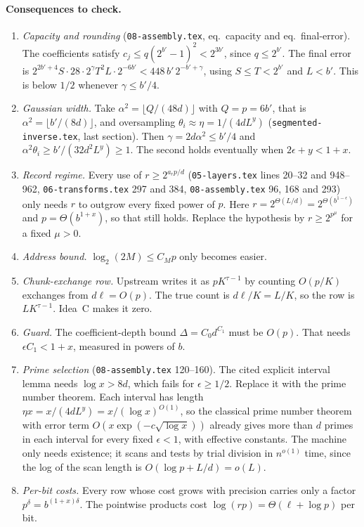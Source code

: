 \documentclass[11pt]{article}
\theoremstyle{remark}\newtheorem*{remark}{Remark}
\begin{document}
\paragraph{Consequences to check.}
\begin{enumerate}
\item \emph{Capacity and rounding} (\texttt{08-assembly.tex}, eq.~capacity and
eq.~final-error). The coefficients satisfy $c_j\le q(2^{b'}-1)^2<2^{3b'}$, since $q\le2^{b'}$.
The final error is $2^{2b'+4}S\cdot28\cdot2^\gamma T^2L\cdot2^{-6b'}<448\,b'\,2^{-b'+\gamma}$,
using $S\le T<2^{b'}$ and $L<b'$. This is below $1/2$ whenever $\gamma\le b'/4$.
\item \emph{Gaussian width.} Take $\alpha^2=\lfloor Q/(48d)\rfloor$ with $Q=p=6b'$, that is $\alpha^2=\lfloor b'/(8d)\rfloor$, and oversampling $\theta_i\approx\eta=1/(4dL^y)$ (\texttt{segmented-inverse.tex}, last section). Then
$\gamma=2d\alpha^2\le b'/4$ and $\alpha^2\theta_i\ge b'/(32d^2L^y)\ge1$. The second holds eventually when $2\epsilon+y<1+x$.
\item \emph{Record regime.} Every use of $r\ge2^{a_rp/d}$ (\texttt{05-layers.tex} lines 20--32
and 948--962, \texttt{06-transforms.tex} 297 and 384, \texttt{08-assembly.tex} 96, 168 and 293)
only needs $r$ to outgrow every fixed power of $p$. Here $r=2^{\Theta(L/d)}=2^{\Theta(b^{1-\epsilon})}$
and $p=\Theta(b^{1+x})$, so that still holds. Replace the hypothesis by
$r\ge2^{p^\mu}$ for a fixed $\mu>0$.
\item \emph{Address bound.} $\log_2(2M)\le C_Mp$ only becomes easier.
\item \emph{Chunk-exchange row.} Upstream writes it as $pK^{\tau-1}$ by counting $O(p/K)$ exchanges from $d\ell=O(p)$. The true count is $d\ell/K=L/K$, so the row is $LK^{\tau-1}$. Idea~C makes it zero.
\item \emph{Guard.} The coefficient-depth bound $\Delta=C_0d^{C_1}$ must be $O(p)$. That needs
$\epsilon C_1<1+x$, measured in powers of $b$.
\item \emph{Prime selection} (\texttt{08-assembly.tex} 120--160). The cited explicit interval
lemma needs $\log x>8d$, which fails for $\epsilon\ge1/2$. Replace it with the prime number theorem. Each interval has length $\eta x=x/(4dL^y)=x/(\log x)^{O(1)}$, so the classical prime number theorem with error term $O(x\exp(-c\sqrt{\log x}))$ already gives more than $d$ primes in each interval for every fixed $\epsilon<1$, with effective constants. The machine only needs existence; it scans and tests by trial division in $n^{o(1)}$ time, since the log of the scan length is $O(\log p+L/d)=o(L)$.
\item \emph{Per-bit costs.} Every row whose cost grows with precision carries only a factor
$p^\delta=b^{(1+x)\delta}$. The pointwise products cost $\log(rp)=\Theta(\ell+\log p)$ per bit.
\end{enumerate}
\end{document}
